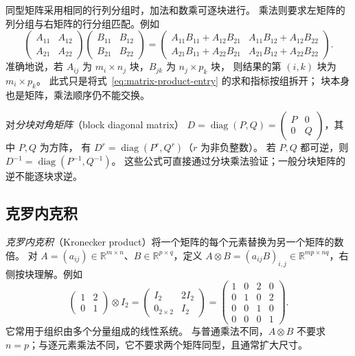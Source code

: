 \documentclass[UTF8,12pt,a4paper,fontset=fandol]{ctexart}
\begin{document}
同型矩阵采用相同的行列分组时，加法和数乘可逐块进行。
乘法则要求左矩阵的列分组与右矩阵的行分组匹配。例如
\[
  \begin{pmatrix}A_{11}&A_{12}\\A_{21}&A_{22}\end{pmatrix}
  \begin{pmatrix}B_{11}&B_{12}\\B_{21}&B_{22}\end{pmatrix}
  =\begin{pmatrix}
    A_{11}B_{11}+A_{12}B_{21}&A_{11}B_{12}+A_{12}B_{22}\\
    A_{21}B_{11}+A_{22}B_{21}&A_{21}B_{12}+A_{22}B_{22}
  \end{pmatrix}.
\]
准确地说，若 $A_{ij}$ 为 $m_i\times n_j$ 块，$B_{jk}$ 为 $n_j\times p_k$ 块，
则结果的第 $(i,k)$ 块为 $m_i\times p_k$。
此式只是将式~\eqref{eq:matrix-product-entry} 的求和指标按组拆开；
块本身也是矩阵，乘法顺序仍不能交换。

对\emph{分块对角矩阵}（block diagonal matrix）
$D=\operatorname{diag}(P,Q)=\begin{pmatrix}P&0\\0&Q\end{pmatrix}$，其中 $P,Q$ 为方阵，
有 $D^r=\operatorname{diag}(P^r,Q^r)$（$r$ 为非负整数）。
若 $P,Q$ 都可逆，则 $D^{-1}=\operatorname{diag}(P^{-1},Q^{-1})$。
这些公式可直接通过分块乘法验证；一般分块矩阵的逆不能逐块求逆。

\subsection{克罗内克积}

\emph{克罗内克积}（Kronecker product）将一个矩阵的每个元素替换为另一个矩阵的数倍。
对 $A=(a_{ij})\in\mathbb R^{m\times n}$、$B\in\mathbb R^{p\times q}$，定义
$A\otimes B=(a_{ij}B)_{i,j}\in\mathbb R^{mp\times nq}$，右侧按块理解。例如
\[
  \begin{pmatrix}1&2\\0&1\end{pmatrix}\otimes I_2
  =\begin{pmatrix}I_2&2I_2\\0_{2\times2}&I_2\end{pmatrix}
  =\begin{pmatrix}1&0&2&0\\0&1&0&2\\0&0&1&0\\0&0&0&1\end{pmatrix}.
\]
它常用于组织由多个分量组成的线性系统。
与普通乘法不同，$A\otimes B$ 不要求 $n=p$；与逐元素乘法不同，它不要求两个矩阵同型，且通常扩大尺寸。
\end{document}
